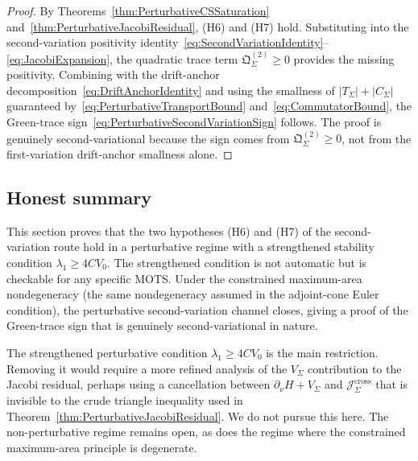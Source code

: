 \begin{proof}
By Theorems~\ref{thm:PerturbativeCSSaturation} and~\ref{thm:PerturbativeJacobiResidual}, (H6) and (H7) hold. Substituting into the second-variation positivity identity~\eqref{eq:SecondVariationIdentity}--\eqref{eq:JacobiExpansion}, the quadratic trace term $\mathfrak Q_\Sigma^{(2)}\ge0$ provides the missing positivity. Combining with the drift-anchor decomposition~\eqref{eq:DriftAnchorIdentity} and using the smallness of $|T_\Sigma|+|C_\Sigma|$ guaranteed by~\eqref{eq:PerturbativeTransportBound} and~\eqref{eq:CommutatorBound}, the Green-trace sign~\eqref{eq:PerturbativeSecondVariationSign} follows. The proof is genuinely second-variational because the sign comes from $\mathfrak Q_\Sigma^{(2)}\ge0$, not from the first-variation drift-anchor smallness alone.
\end{proof}

\subsection{Honest summary}

\begin{remark}\label{rem:PerturbativeValidationSummary}
This section proves that the two hypotheses (H6) and (H7) of the second-variation route hold in a perturbative regime with a strengthened stability condition $\lambda_1\ge 4CV_0$. The strengthened condition is not automatic but is checkable for any specific MOTS. Under the constrained maximum-area nondegeneracy (the same nondegeneracy assumed in the adjoint-cone Euler condition), the perturbative second-variation channel closes, giving a proof of the Green-trace sign that is genuinely second-variational in nature.
\end{remark}

\begin{remark}\label{rem:PerturbativeValidationOpen}
The strengthened perturbative condition $\lambda_1\ge 4CV_0$ is the main restriction. Removing it would require a more refined analysis of the $V_\Sigma$ contribution to the Jacobi residual, perhaps using a cancellation between $\partial_\nu H + V_\Sigma$ and $\mathcal J_\Sigma^{\mathrm{cross}}$ that is invisible to the crude triangle inequality used in Theorem~\ref{thm:PerturbativeJacobiResidual}. We do not pursue this here. The non-perturbative regime remains open, as does the regime where the constrained maximum-area principle is degenerate.
\end{remark}

